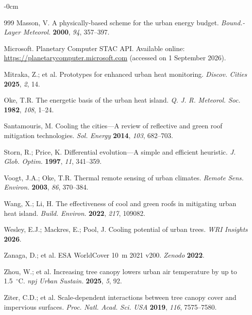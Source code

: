 \documentclass[remotesensing,article,submit,oneauthor]{Definitions/mdpi}
\begin{document}
\begin{adjustwidth}{-\extralength}{0cm}
{\begin{thebibliography}{999}
Masson, V. A physically-based scheme for the urban energy budget.
\textit{Bound.-Layer Meteorol.} \textbf{2000}, \textit{94}, 357--397.

Microsoft. Planetary Computer STAC API. Available online:
\url{https://planetarycomputer.microsoft.com} (accessed on 1 September
2026).

Mitraka, Z.; et al. Prototypes for enhanced urban heat monitoring.
\textit{Discov. Cities} \textbf{2025}, \textit{2}, 14.

Oke, T.R. The energetic basis of the urban heat island. \textit{Q. J. R.
Meteorol. Soc.} \textbf{1982}, \textit{108}, 1--24.

Santamouris, M. Cooling the cities---A review of reflective and green
roof mitigation technologies. \textit{Sol. Energy} \textbf{2014},
\textit{103}, 682--703.

Storn, R.; Price, K. Differential evolution---A simple and efficient
heuristic. \textit{J. Glob. Optim.} \textbf{1997}, \textit{11}, 341--359.

Voogt, J.A.; Oke, T.R. Thermal remote sensing of urban climates.
\textit{Remote Sens. Environ.} \textbf{2003}, \textit{86}, 370--384.

Wang, X.; Li, H. The effectiveness of cool and green roofs in mitigating
urban heat island. \textit{Build. Environ.} \textbf{2022}, \textit{217},
109082.

Wesley, E.J.; Mackres, E.; Pool, J. Cooling potential of urban trees.
\textit{WRI Insights} \textbf{2026}.

Zanaga, D.; et al. ESA WorldCover 10~m 2021 v200. \textit{Zenodo}
\textbf{2022}.

Zhou, W.; et al. Increasing tree canopy lowers urban air temperature by
up to 1.5~$^{\circ}$C. \textit{npj Urban Sustain.} \textbf{2025},
\textit{5}, 92.

Ziter, C.D.; et al. Scale-dependent interactions between tree canopy
cover and impervious surfaces. \textit{Proc. Natl. Acad. Sci. USA}
\textbf{2019}, \textit{116}, 7575--7580.

\end{thebibliography}
}

\PublishersNote{}
\end{adjustwidth}
\end{document}
